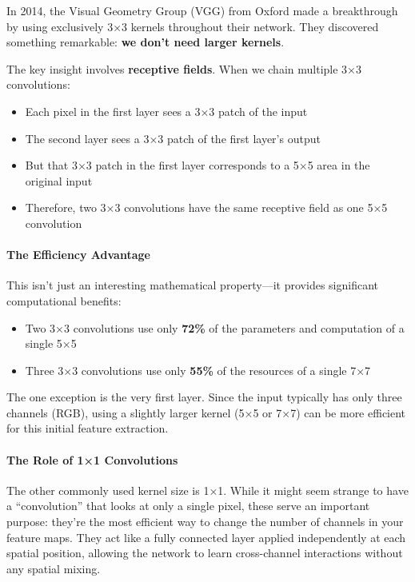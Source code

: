 \documentclass{article}
\begin{document}
In 2014, the Visual Geometry Group (VGG) from Oxford made a breakthrough by using exclusively 3×3 kernels throughout their network. They discovered something remarkable: \textbf{we don't need larger kernels}.

The key insight involves \textbf{receptive fields}. When we chain multiple 3×3 convolutions:
\begin{itemize}
    \item Each pixel in the first layer sees a 3×3 patch of the input
    \item The second layer sees a 3×3 patch of the first layer's output
    \item But that 3×3 patch in the first layer corresponds to a 5×5 area in the original input
    \item Therefore, two 3×3 convolutions have the same receptive field as one 5×5 convolution
\end{itemize}

\paragraph{The Efficiency Advantage}

This isn't just an interesting mathematical property—it provides significant computational benefits:
\begin{itemize}
    \item Two 3×3 convolutions use only \textbf{72\%} of the parameters and computation of a single 5×5
    \item Three 3×3 convolutions use only \textbf{55\%} of the resources of a single 7×7
\end{itemize}

The one exception is the very first layer. Since the input typically has only three channels (RGB), using a slightly larger kernel (5×5 or 7×7) can be more efficient for this initial feature extraction.

\paragraph{The Role of 1×1 Convolutions}

The other commonly used kernel size is 1×1. While it might seem strange to have a ``convolution'' that looks at only a single pixel, these serve an important purpose: they're the most efficient way to change the number of channels in your feature maps. They act like a fully connected layer applied independently at each spatial position, allowing the network to learn cross-channel interactions without any spatial mixing.
\end{document}
